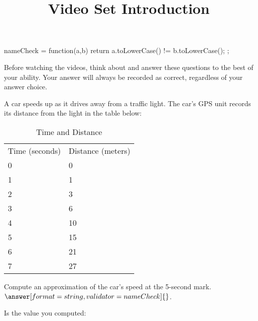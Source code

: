\documentclass[handout]{ximera}
\title{Video Set Introduction}
\begin{document}
\begin{abstract}
\end{abstract}


\maketitle

\begin{javascript}
  nameCheck = function(a,b) {
    return a.toLowerCase() != b.toLowerCase();
  };
\end{javascript}

Before watching the videos, think about and answer these questions to the best of your ability. Your answer will always be recorded as correct, regardless of your answer choice.

A car speeds up as it drives away from a traffic light. The car’s GPS unit records its distance from the light in the table below:


\begin{table}[h!]
\centering
\caption{Time and Distance}
\label{my-label}
\begin{tabular}{ll}
Time (seconds) & Distance (meters) \\
0              & 0                 \\
1              & 1                 \\
2              & 3                 \\
3              & 6                 \\
4              & 10                \\
5              & 15                \\
6              & 21                \\
7              & 27
\end{tabular}
\end{table}

\begin{problem}
Compute an approximation of the car’s speed at the 5-second mark.
$\answer[format=string,validator=nameCheck]{}$.
\end{problem}

\begin{problem}
Is the value you computed:
\begin{multipleChoice}
\end{multipleChoice}
\end{problem}
\end{document}
